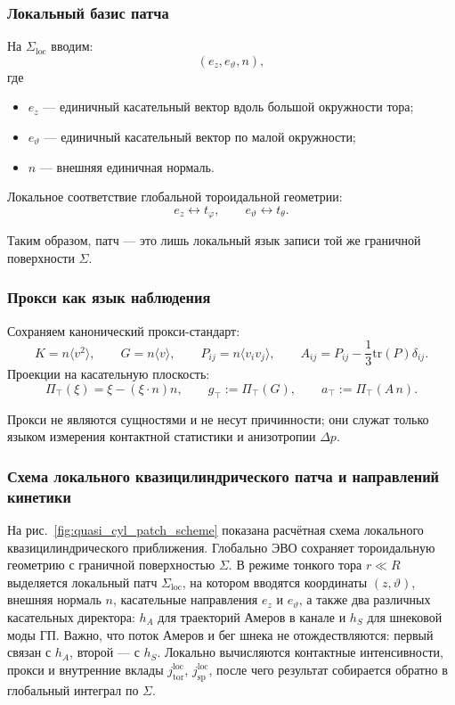 \subsubsection{Локальный базис патча}

На \(\Sigma_{\mathrm{loc}}\) вводим:
\[
(e_z,e_\vartheta,n),
\]
где
\begin{itemize}
\item \(e_z\) --- единичный касательный вектор вдоль большой окружности тора;
\item \(e_\vartheta\) --- единичный касательный вектор по малой окружности;
\item \(n\) --- внешняя единичная нормаль.
\end{itemize}

Локальное соответствие глобальной тороидальной геометрии:
\[
e_z \leftrightarrow t_\varphi,\qquad e_\vartheta \leftrightarrow t_\theta.
\]

Таким образом, патч --- это лишь локальный язык записи той же граничной поверхности \(\Sigma\).

\subsubsection{Прокси как язык наблюдения}

Сохраняем канонический прокси-стандарт:
\[
K=n\langle v^2\rangle,\qquad
G=n\langle v\rangle,\qquad
P_{ij}=n\langle v_i v_j\rangle,\qquad
A_{ij}=P_{ij}-\frac13\mathrm{tr}(P)\delta_{ij}.
\]
Проекции на касательную плоскость:
\[
\Pi_\top(\xi)=\xi-(\xi\cdot n)n,\qquad
g_\top:=\Pi_\top(G),\qquad
a_\top:=\Pi_\top(A\,n).
\]

Прокси не являются сущностями и не несут причинности; они служат только языком измерения контактной статистики и анизотропии \(\Delta p\).


\subsubsection{Схема локального квазицилиндрического патча и направлений кинетики}

На рис.~\ref{fig:quasi_cyl_patch_scheme} показана расчётная схема локального квазицилиндрического приближения. Глобально ЭВО сохраняет тороидальную геометрию с граничной поверхностью \(\Sigma\). В режиме тонкого тора \(r\ll R\) выделяется локальный патч \(\Sigma_{\mathrm{loc}}\), на котором вводятся координаты \((z,\vartheta)\), внешняя нормаль \(n\), касательные направления \(e_z\) и \(e_\vartheta\), а также два различных касательных директора: \(h_A\) для траекторий Амеров в канале и \(h_S\) для шнековой моды ГП. Важно, что поток Амеров и бег шнека не отождествляются: первый связан с \(h_A\), второй --- с \(h_S\). Локально вычисляются контактные интенсивности, прокси и внутренние вклады \(j_{\mathrm{tor}}^{\mathrm{loc}}\), \(j_{\mathrm{sp}}^{\mathrm{loc}}\), после чего результат собирается обратно в глобальный интеграл по \(\Sigma\).

